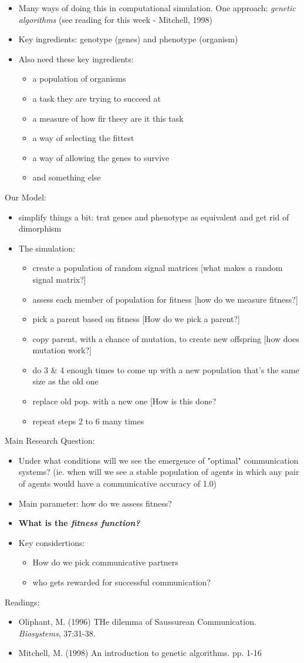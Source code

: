 \documentclass[11pt]{amsart}
\begin{document}
\begin{itemize}
\item Many ways of doing this in computational simulation. One approach: {\it genetic algorithms} (see reading for this week - Mitchell, 1998)
\item Key ingredients: genotype (genes) and phenotype (organism)
\item Also need these key ingredients:
\begin{itemize}
\item a population of organisms
\item a task they are trying to succeed at
\item  a measure of how fir theey are it this task
\item a way of selecting the fittest
\item  a way of allowing the genes to survive
\item and something else
\end{itemize}
\end{itemize}
\newpage
Our Model:
\begin{itemize}
\item simplify things a bit: trat genes and phenotype as equivalent and get rid of dimorphism %
\item The simulation:
\begin{itemize}
\item create a population of random signal matrices [what makes a random signal matrix?]
\item assess each member of population for fitness [how do we measure fitness?]
\item pick a parent based on fitness [How do we pick a parent?]
\item copy parent, with a chance of mutation, to create new offspring [how does mutation work?]
\item do 3 \& 4 enough times to come up with a new population that's the same size as the old one
\item replace old pop. with a new one [How is this done? 
\item repeat steps 2 to 6 many times
\end{itemize}
\end{itemize}
Main Research Question: \begin{itemize}
\item Under what conditions will we see the emergence of "optimal" communication systems? (ie. when will we see a stable population of agents in which any pair of agents would have a communicative accuracy of 1.0)
\item Main parameter: how do we assess fitness?
\item {\bf What is the {\it fitness function?}}
\item Key considertions: 
\begin{itemize} \item How do we pick communicative partners
\item who gets rewarded for successful communication?
\end{itemize}
\end{itemize}

Readings:
\begin{itemize}
\item Oliphant, M. (1996) THe dilemma of Saussurean Communication. {\it Biosystems}, 37:31-38.
\item Mitchell, M. (1998) An introduction to genetic algorithms. pp. 1-16
\end{itemize}
\end{document}
